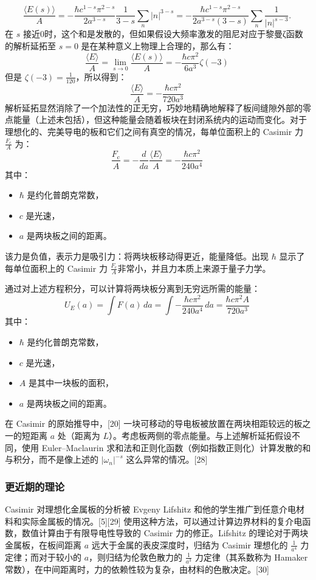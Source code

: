 \[
\frac{\langle E(s)\rangle}{A} = - \frac{\hbar c^{1-s} \pi^{2-s}}{2a^{3-s}} \frac{1}{3-s} \sum_{n} |n|^{3-s} = - \frac{\hbar c^{1-s} \pi^{2-s}}{2a^{3-s}(3-s)} \sum_{n} \frac{1}{|n|^{s-3}}.~
\]
在 \(s\) 接近0时，这个和是发散的，但如果假设大频率激发的阻尼对应于黎曼ζ函数的解析延拓至 \(s = 0\) 是在某种意义上物理上合理的，那么有：
\[
\frac{\langle E\rangle}{A} = \lim_{s \to 0} \frac{\langle E(s)\rangle}{A} = -\frac{\hbar c \pi^2}{6a^3} \zeta(-3)~
\]
但是 \(\zeta(-3) = \frac{1}{120}\)，所以得到：
\[
\frac{\langle E\rangle}{A} = -\frac{\hbar c \pi^2}{720 a^3}~
\]
解析延拓显然消除了一个加法性的正无穷，巧妙地精确地解释了板间缝隙外部的零点能量（上述未包括），但这种能量会随着板块在封闭系统内的运动而变化。对于理想化的、完美导电的板和它们之间有真空的情况，每单位面积上的 Casimir 力 \(\frac{F_c}{A}\) 为：
\[
\frac{F_{\mathrm{c}}}{A} = -\frac{d}{da} \frac{\langle E \rangle}{A} = -\frac{\hbar c \pi^2}{240 a^4}~
\]
其中：
\begin{itemize}
\item \(\hbar\) 是约化普朗克常数，
\item \(c\) 是光速，
\item \(a\) 是两块板之间的距离。
\end{itemize}

该力是负值，表示力是吸引力：将两块板移动得更近，能量降低。出现 \(\hbar\) 显示了每单位面积上的 Casimir 力 \(\frac{F_c}{A}\)非常小，并且力本质上来源于量子力学。

通过对上述方程积分，可以计算将两块板分离到无穷远所需的能量：
\[
U_E(a) = \int F(a) \, da = \int -\frac{\hbar c \pi^2}{240 a^4} \, da = \frac{\hbar c \pi^2 A}{720 a^3}~
\]
其中：
\begin{itemize}
\item \(\hbar\) 是约化普朗克常数，
\item \(c\) 是光速，
\item \(A\) 是其中一块板的面积，
\item \(a\) 是两块板之间的距离。
\end{itemize}
在 Casimir 的原始推导中，[20] 一块可移动的导电板被放置在两块相距较远的板之一的短距离 \(a\) 处（距离为 \(L\)）。考虑板两侧的零点能量。与上述解析延拓假设不同，使用 Euler–Maclaurin 求和法和正则化函数（例如指数正则化）计算发散的和与积分，而不是像上述的 \(|\omega_n|^{-s}\) 这么异常的情况。[28]
\subsubsection{更近期的理论}  
Casimir 对理想化金属板的分析被 Evgeny Lifshitz 和他的学生推广到任意介电材料和实际金属板的情况。[5][29] 使用这种方法，可以通过计算边界材料的复介电函数，数值计算由于有限导电性导致的 Casimir 力的修正。Lifshitz 的理论对于两块金属板，在板间距离 \(a\) 远大于金属的表皮深度时，归结为 Casimir 理想化的 \(\frac{1}{a^4}\) 力定律；而对于较小的 \(a\)，则归结为伦敦色散力的 \(\frac{1}{a^3}\) 力定律（其系数称为 Hamaker 常数），在中间距离时，力的依赖性较为复杂，由材料的色散决定。[30]

